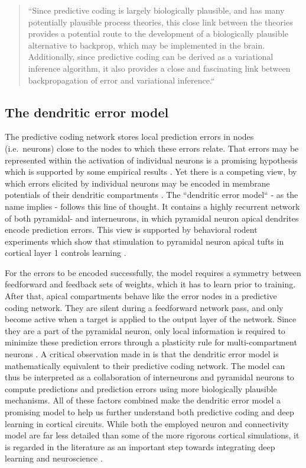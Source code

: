\begin{quotation}
  \noindent``Since predictive coding is largely biologically plausible, and has many potentially plausible process
  theories, this close link between the theories provides a potential route to the development of a biologically
  plausible alternative to backprop, which may be implemented in the brain. Additionally, since predictive coding can be
  derived as a variational inference algorithm, it also provides a close and fascinating link between backpropagation of
  error and variational inference.`` \citep{millidge2021predictive} \end{quotation}


\subsection{The dendritic error model}

The predictive coding network stores local prediction errors in nodes (i.e.\ neurons) close to the nodes to which these
errors relate. That errors may be represented within the activation of individual neurons is a promising hypothesis
which is supported by some empirical results \citep{Hertaeg2022}. Yet there is a competing view, by which errors
elicited by individual neurons may be encoded in membrane potentials of their dendritic compartments
\citep{guerguiev2017towards}. The ``dendritic error model`` \citep{sacramento2018dendritic} - as the name implies -
follows this line of thought. It contains a highly recurrent network of both pyramidal- and interneurons, in which
pyramidal neuron apical dendrites encode prediction errors. This view is supported by behavioral rodent experiments
which show that stimulation to pyramidal neuron apical tufts in cortical layer 1 controls learning \citep{Doron2020}.

For the errors to be encoded successfully, the model requires a symmetry between feedforward and feedback sets of
weights, which it has to learn prior to training. After that, apical compartments behave like the error nodes in a
predictive coding network. They are silent during a feedforward network pass, and only become active when a target is
applied to the output layer of the network. Since they are a part of the pyramidal neuron, only local information is
required to minimize these prediction errors through a plasticity rule for multi-compartment neurons
\citep{urbanczik2014learning}. A critical observation made in \citep{whittington2019theories} is that the dendritic
error model is mathematically equivalent to their predictive coding network. The model can thus be interpreted as a
collaboration of interneurons and pyramidal neurons to compute predictions and prediction errors using more biologically
plausible mechanisms.  All of these factors combined make the dendritic error model a promising model to help us further
understand both predictive coding and deep learning in cortical circuits. While both the employed neuron and
connectivity model are far less detailed than some of the more rigorous cortical simulations, it is regarded in the
literature as an important step towards integrating deep learning and neuroscience \citep{Richards2019}.



